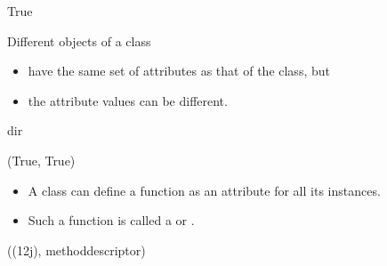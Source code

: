 \documentclass[letterpaper,10pt,english]{sphinxmanual}
\begin{document}
\begin{sphinxVerbatim}[commandchars=\\\{\}]
True
\end{sphinxVerbatim}

Different objects of a class
\begin{itemize}
\item {} 
have the same set of attributes as that of the class, but

\item {} 
the attribute values can be different.

\end{itemize}

\begin{sphinxVerbatim}[commandchars=\\\{\}]
dir
     
\end{sphinxVerbatim}

\begin{sphinxVerbatim}[commandchars=\\\{\}]
(True, True)
\end{sphinxVerbatim}

\begin{itemize}
\item {} 
A class can define a function as an attribute for all its instances.

\item {} 
Such a function is called a  or .

\end{itemize}

\begin{sphinxVerbatim}[commandchars=\\\{\}]
  
\end{sphinxVerbatim}

\begin{sphinxVerbatim}[commandchars=\\\{\}]
((1\PYGZhy{}2j), method\PYGZus{}descriptor)
\end{sphinxVerbatim}
\end{document}
